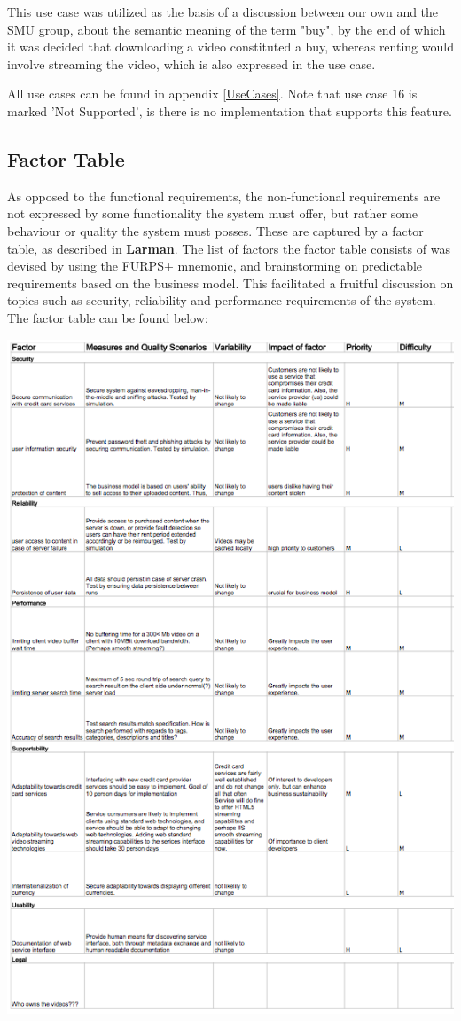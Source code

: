 This use case was utilized as the basis of a discussion between our own and the SMU group, about the semantic meaning of the term "buy", by the end of which it was decided that downloading a video constituted a buy, whereas renting would involve streaming the video, which is also expressed in the use case.

All use cases can be found in appendix \ref{UseCases}. Note that use case 16 is marked 'Not Supported', is there is no implementation that supports this feature.

\subsection{Factor Table}
\label{FactorTable}
As opposed to the functional requirements, the non-functional requirements are not expressed by some functionality the system must offer, but rather some behaviour or quality the system must posses. These are captured by a factor table, as described in \textbf{Larman}. The list of factors the factor table consists of was devised by using the FURPS+ mnemonic, and brainstorming on predictable requirements based on the business model. This facilitated a fruitful discussion on topics such as security, reliability and performance requirements of the system. The factor table can be found below:
\begin{center}
\includegraphics[scale=1.3]{FactorTable.png}
\end{center}

